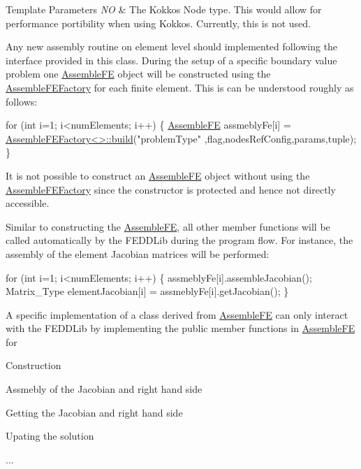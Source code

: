 \begin{DoxyTemplParams}{Template Parameters}
{\em NO} & The Kokkos Node type. This would allow for performance portibility when using Kokkos. Currently, this is not used.\\
\hline
\end{DoxyTemplParams}
Any new assembly routine on element level should implemented following the interface provided in this class. During the setup of a specific boundary value problem one \hyperlink{classFEDD_1_1AssembleFE}{Assemble\+FE} object will be constructed using the \hyperlink{classFEDD_1_1AssembleFEFactory}{Assemble\+F\+E\+Factory} for each finite element. This is can be understood roughly as follows\+: 
\begin{DoxyCode}
\textcolor{keywordflow}{for} (\textcolor{keywordtype}{int} i=1; i<numElements; i++) \{
    \hyperlink{classFEDD_1_1AssembleFE_a5ff56b610942ec92cc1b1e0ac1e07ce4}{AssembleFE} assmeblyFe[i] = \hyperlink{classFEDD_1_1AssembleFEFactory_ac895d65acf2626100832586df84d6a9c}{AssembleFEFactory<>::build}(\textcolor{stringliteral}{"problemType"}
      ,flag,nodesRefConfig,params,tuple);
\}
\end{DoxyCode}
 It is not possible to construct an \hyperlink{classFEDD_1_1AssembleFE}{Assemble\+FE} object without using the \hyperlink{classFEDD_1_1AssembleFEFactory}{Assemble\+F\+E\+Factory} since the constructor is protected and hence not directly accessible.

Similar to constructing the \hyperlink{classFEDD_1_1AssembleFE}{Assemble\+FE}, all other member functions will be called automatically by the F\+E\+D\+D\+Lib during the program flow. For instance, the assembly of the element Jacobian matrices will be performed\+: 
\begin{DoxyCode}
\textcolor{keywordflow}{for} (\textcolor{keywordtype}{int} i=1; i<numElements; i++) \{
    assmeblyFe[i].assembleJacobian();
    Matrix\_Type elementJacobian[i] = assmeblyFe[i].getJacobian();
\}
\end{DoxyCode}
 A specific implementation of a class derived from \hyperlink{classFEDD_1_1AssembleFE}{Assemble\+FE} can only interact with the F\+E\+D\+D\+Lib by implementing the public member functions in \hyperlink{classFEDD_1_1AssembleFE}{Assemble\+FE} for
\begin{DoxyItemize}
\item Construction
\item Assmebly of the Jacobian and right hand side
\item Getting the Jacobian and right hand side
\item Upating the solution
\item ...
\end{DoxyItemize}

